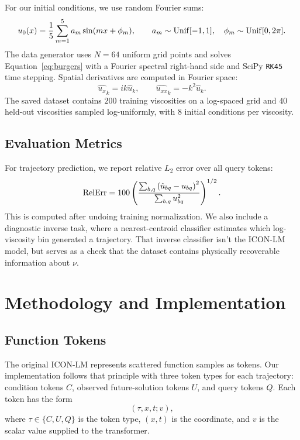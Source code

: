 \documentclass[11pt]{article}
\begin{document}
For our initial conditions, we use random Fourier sums:
\begin{equation}
u_0(x)=\frac{1}{5}\sum_{m=1}^{5} a_m\sin(mx+\phi_m),
\qquad
a_m\sim{\rm Unif}[-1,1],\quad
\phi_m\sim{\rm Unif}[0,2\pi].
\label{eq:ic}
\end{equation}
The data generator uses $N=64$ uniform grid points and solves
Equation~\eqref{eq:burgers} with a Fourier spectral right-hand side and SciPy
\texttt{RK45} time stepping. Spatial derivatives are computed in Fourier space:
\begin{equation}
\widehat{u_x}_k = i k \hat u_k,
\qquad
\widehat{u_{xx}}_k = -k^2 \hat u_k.
\end{equation}
The saved dataset contains $200$ training viscosities on a log-spaced grid and
$40$ held-out viscosities sampled log-uniformly, with $8$ initial conditions per
viscosity.

\subsection{Evaluation Metrics}

For trajectory prediction, we report relative $L_2$ error over all query tokens:
\begin{equation}
{\rm RelErr} =
100\left(
\frac{\sum_{b,q} \left(\hat u_{bq}-u_{bq}\right)^2}
     {\sum_{b,q} u_{bq}^2}
\right)^{1/2}.
\label{eq:relerr}
\end{equation}
This is computed after undoing training normalization. We also
include a diagnostic inverse task, where a nearest-centroid classifier estimates which
log-viscosity bin generated a trajectory. That inverse classifier isn't the
ICON-LM model, but serves as a check that the dataset contains physically recoverable
information about $\nu$.

\section{Methodology and Implementation}
\label{sec:methodology}

\subsection{Function Tokens}

The original ICON-LM represents scattered function samples as tokens. Our
implementation follows that principle with three token types for each trajectory:
condition tokens $C$, observed future-solution tokens $U$, and query tokens $Q$.
Each token has the form
\begin{equation}
(\tau,x,t;v),
\end{equation}
where $\tau\in\{C,U,Q\}$ is the token type, $(x,t)$ is the coordinate, and $v$ is
the scalar value supplied to the transformer.
\end{document}
